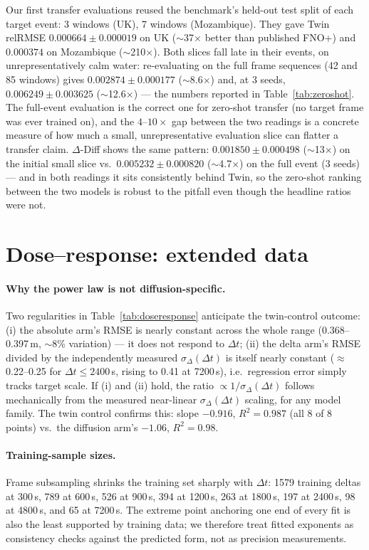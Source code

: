 \documentclass[11pt]{article}
\newcommand{\ours}{\mbox{$\Delta$-Diff}}
\newcommand{\twin}{\mbox{Twin}}
\begin{document}
Our first transfer evaluations reused the benchmark's held-out test
split of each target event: 3 windows (UK), 7 windows (Mozambique). They
gave \twin{} relRMSE $0.000664\pm0.000019$ on UK ($\sim$37$\times$ better
than published FNO+) and $0.000374$ on Mozambique ($\sim$210$\times$).
Both slices fall late in their events, on unrepresentatively calm water:
re-evaluating on the full frame sequences (42 and 85 windows) gives
$0.002874\pm0.000177$ ($\sim$8.6$\times$) and, at 3 seeds,
$0.006249\pm0.003625$ ($\sim$12.6$\times$) --- the numbers reported in
Table~\ref{tab:zeroshot}. The full-event evaluation is the correct one
for zero-shot transfer (no target frame was ever trained on), and the
$4$--$10\times$ gap between the two readings is a concrete measure of
how much a small, unrepresentative evaluation slice can flatter a
transfer claim. \ours{} shows the same pattern: $0.001850\pm0.000498$
($\sim$13$\times$) on the initial small slice vs.\
$0.005232\pm0.000820$ ($\sim$4.7$\times$) on the full event (3 seeds) ---
and in both readings it sits consistently behind \twin{}, so the
zero-shot ranking between the two models is robust to the pitfall even
though the headline ratios were not.

\section{Dose--response: extended data}
\label{app:doseresponse}

\paragraph{Why the power law is not diffusion-specific.} Two regularities
in Table~\ref{tab:doseresponse} anticipate the twin-control outcome:
(i) the absolute arm's RMSE is nearly constant across the whole range
(0.368--0.397\,m, $\sim$8\% variation) --- it does not respond to
$\Delta t$; (ii) the delta arm's RMSE divided by the independently
measured $\sigma_\Delta(\Delta t)$ is itself nearly constant
($\approx$0.22--0.25 for $\Delta t \le 2400$\,s, rising to 0.41 at
7200\,s), i.e.\ regression error simply tracks target scale. If (i) and
(ii) hold, the ratio $\propto 1/\sigma_\Delta(\Delta t)$ follows
mechanically from the measured near-linear $\sigma_\Delta(\Delta t)$
scaling, for any model family. The twin control confirms this: slope
$-0.916$, $R^2=0.987$ (all 8 of 8 points) vs.\ the diffusion arm's
$-1.06$, $R^2=0.98$.

\paragraph{Training-sample sizes.} Frame subsampling shrinks the
training set sharply with $\Delta t$: 1579 training deltas at 300\,s,
789 at 600\,s, 526 at 900\,s, 394 at 1200\,s, 263 at 1800\,s, 197 at
2400\,s, 98 at 4800\,s, and 65 at 7200\,s. The extreme point anchoring
one end of every fit is also the least supported by training data; we
therefore treat fitted exponents as consistency checks against the
predicted form, not as precision measurements.
\end{document}
